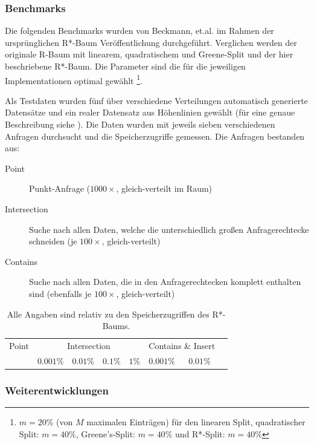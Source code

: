 \documentclass[runningheads,a4paper]{llncs}
\begin{document}
	\subsubsection{Benchmarks} %
	\label{ssub:benchmarks}

	Die folgenden Benchmarks wurden von Beckmann, et.al. im Rahmen der ursprünglichen R*-Baum Veröffentlichung durchgeführt. Verglichen werden der originale R-Baum mit linearem, quadratischem und Greene-Split und der hier beschriebene R*-Baum. Die Parameter sind die für die jeweiligen Implementationen optimal gewählt \citep[vgl.][328]{Kriegel:2008}\footnote{$m=20\%$ (von $M$ maximalen Einträgen) für den linearen Split, quadratischer Split: $m=40\%$, Greene's-Split: $m=40\%$ und R*-Split: $m=40\%$}.

	Als Testdaten wurden fünf über verschiedene Verteilungen automatisch generierte Datensätze und ein realer Datensatz aus Höhenlinien gewählt (für eine genaue Beschreibung siehe \cite[328]{Kriegel:2008}). Die Daten wurden mit jeweils sieben verschiedenen Anfragen durchsucht und die Speicherzugriffe gemessen. Die Anfragen bestanden aus:
	\begin{description}
		\item[Point] Punkt-Anfrage ($1000\times$, gleich-verteilt im Raum)
		\item[Intersection] Suche nach allen Daten, welche die unterschiedlich großen Anfragerechtecke schneiden (je $100\times$, gleich-verteilt)
		\item[Contains] Suche nach allen Daten, die in den Anfragerechtecken komplett enthalten sind (ebenfalls je $100\times$, gleich-verteilt)
	\end{description}

	\begin{table}
	\caption{Alle Angaben sind relativ zu den Speicherzugriffen des R*-Baums.}
	\begin{tabularx}{\textwidth}{X|X|X|X|X|X|X|X}
		Point & \multicolumn{4}{c|}{Intersection} & \multicolumn{2}{c}{Contains \& Insert} \\
		 & $0.001\%$ & $0.01\%$ & $0.1\%$ & $1\%$ & $0.001\%$ & $0.01\%$ & 
	\end{tabularx}
	\end{table}
	

	\subsubsection{Weiterentwicklungen} %
	\label{ssub:weiterentwicklungen}
\end{document}
